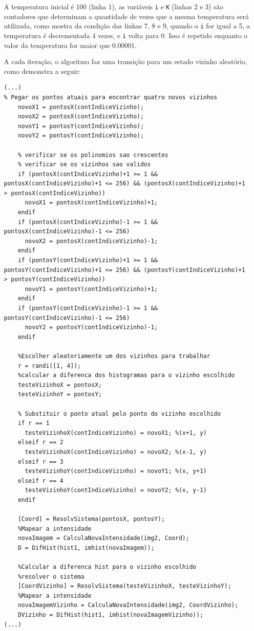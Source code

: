 A temperatura inicial é 100 (linha 1), as variáveis \texttt{i} e \texttt{K} (linhas 2 e 3) são contadores que determinam a quantidade de vezes que a mesma temperatura será utilizada, como mostra da condição das linhas 7, 8 e 9, quando o \texttt{i} for igual a 5, a temperatura é decrementada 4 vezes, e \texttt{i} volta para 0. Isso é repetido enquanto o valor da temperatura for maior que 0.00001.

A cada iteração, o algoritmo faz uma transição para um estado vizinho aleatório, como demonstra a seguir:
 
\begin{lstlisting}[style=Matlab-editor]
(...)
% Pegar os pontos atuais para encontrar quatro novos vizinhos 
    novoX1 = pontosX(contIndiceVizinho);
    novoX2 = pontosX(contIndiceVizinho);
    novoY1 = pontosY(contIndiceVizinho);
    novoY2 = pontosY(contIndiceVizinho);
    
    % verificar se os polinomios sao crescentes
    % verificar se os vizinhos sao validos
    if (pontosX(contIndiceVizinho)+1 >= 1 && pontosX(contIndiceVizinho)+1 <= 256) && (pontosX(contIndiceVizinho)+1 > pontosX(contIndiceVizinho)) 
      novoX1 = pontosX(contIndiceVizinho)+1;
    endif
    if (pontosX(contIndiceVizinho)-1 >= 1 && pontosX(contIndiceVizinho)-1 <= 256)
      novoX2 = pontosX(contIndiceVizinho)-1;
    endif
    if (pontosY(contIndiceVizinho)+1 >= 1 && pontosY(contIndiceVizinho)+1 <= 256) && (pontosY(contIndiceVizinho)+1 > pontosY(contIndiceVizinho))
      novoY1 = pontosY(contIndiceVizinho)+1;
    endif
    if (pontosY(contIndiceVizinho)-1 >= 1 && pontosY(contIndiceVizinho)-1 <= 256) 
      novoY2 = pontosY(contIndiceVizinho)-1;
    endif
    
    %Escolher aleatoriamente um dos vizinhos para trabalhar
    r = randi([1, 4]);
    %calcular a diferenca dos histogramas para o vizinho escolhido
    testeVizinhoX = pontosX; 
    testeVizinhoY = pontosY;
    
    % Substituir o ponto atual pelo ponto do vizinho escolhido  
    if r == 1
      testeVizinhoX(contIndiceVizinho) = novoX1; %(x+1, y)
    elseif r == 2
      testeVizinhoX(contIndiceVizinho) = novoX2; %(x-1, y)
    elseif r == 3
      testeVizinhoY(contIndiceVizinho) = novoY1; %(x, y+1)
    elseif r == 4
      testeVizinhoY(contIndiceVizinho) = novoY2; %(x, y-1)
    endif

    [Coord] = ResolvSistema(pontosX, pontosY);
    %Mapear a intensidade
    novaImagem = CalculaNovaIntensidade(img2, Coord);  
    D = DifHist(hist1, imhist(novaImagem));
  
    %Calcular a diferenca hist para o vizinho escolhido
    %resolver o sistema 
    [CoordVizinho] = ResolvSistema(testeVizinhoX, testeVizinhoY);
    %Mapear a intensidade
    novaImagemVizinho = CalculaNovaIntensidade(img2, CoordVizinho);  
    DVizinho = DifHist(hist1, imhist(novaImagemVizinho));  
(...)
\end{lstlisting}
 
